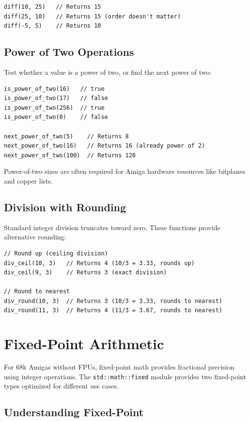 \begin{lstlisting}
diff(10, 25)   // Returns 15
diff(25, 10)   // Returns 15 (order doesn't matter)
diff(-5, 5)    // Returns 10
\end{lstlisting}

\subsection{Power of Two Operations}

Test whether a value is a power of two, or find the next power of two:

\begin{lstlisting}
is_power_of_two(16)   // true
is_power_of_two(17)   // false
is_power_of_two(256)  // true
is_power_of_two(0)    // false

next_power_of_two(5)    // Returns 8
next_power_of_two(16)   // Returns 16 (already power of 2)
next_power_of_two(100)  // Returns 128
\end{lstlisting}

Power-of-two sizes are often required for Amiga hardware resources like bitplanes and copper lists.

\subsection{Division with Rounding}

Standard integer division truncates toward zero. These functions provide alternative rounding:

\begin{lstlisting}
// Round up (ceiling division)
div_ceil(10, 3)   // Returns 4 (10/3 = 3.33, rounds up)
div_ceil(9, 3)    // Returns 3 (exact division)

// Round to nearest
div_round(10, 3)  // Returns 3 (10/3 = 3.33, rounds to nearest)
div_round(11, 3)  // Returns 4 (11/3 = 3.67, rounds to nearest)
\end{lstlisting}

\section{Fixed-Point Arithmetic}
\label{sec:math-fixed}

For 68k Amigas without FPUs, fixed-point math provides fractional precision using integer operations. The \texttt{std::math::fixed} module provides two fixed-point types optimized for different use cases.

\subsection{Understanding Fixed-Point}

